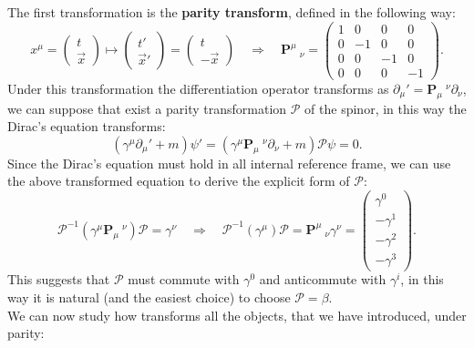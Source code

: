 The first transformation is the \textbf{parity transform}, defined in the following way:
\begin{equation}
    \label{parity}x^\mu=\begin{pmatrix}
        t\\\vec x
    \end{pmatrix}\longmapsto \begin{pmatrix}
        t'\\\vec x'
    \end{pmatrix}=\begin{pmatrix}
        t\\-\vec x
    \end{pmatrix} \quad\Rightarrow\quad \mathbf{P}  ^\mu\ _\nu=\begin{pmatrix}
        1&0&0&0\\0&-1&0&0\\0&0&-1&0\\0&0&0&-1
    \end{pmatrix}.
\end{equation}
Under this transformation the differentiation operator transforms as $\partial_\mu'=\mathbf{P}  _\mu\ ^\nu\partial_\nu$, we can suppose that exist a parity transformation $\mathcal{P} $ of the spinor, in this way the Dirac's equation transforms:
\begin{equation*}
    (\gamma^\mu\partial_\mu'+m)\psi'=(\gamma^\mu\mathbf{P}  _\mu\ ^\nu\partial_\nu+m)\mathcal{P} \psi=0.
\end{equation*}
Since the Dirac's equation must hold in all internal reference frame, we can use the above transformed equation to derive the explicit form of $\mathcal{P} $:
\begin{equation*}
    \mathcal{P} ^{-1}(\gamma^\mu\mathbf{P}  _\mu\ ^\nu)\mathcal{P} =\gamma^\nu\quad\Rightarrow\quad\mathcal{P} ^{-1}(\gamma^\mu)\mathcal{P} =\mathbf{P}  ^\mu\ _\nu\gamma^\nu=\begin{pmatrix}
        \gamma^0\\-\gamma^1\\-\gamma^2\\-\gamma^3
    \end{pmatrix}.
\end{equation*}
This suggests that $\mathcal{P}$ must commute with $\gamma^0$ and anticommute with $\gamma^i$, in this way it is natural (and the easiest choice) to choose $\mathcal{P} =\beta$.\\
We can now study how transforms all the objects, that we have introduced, under parity:
